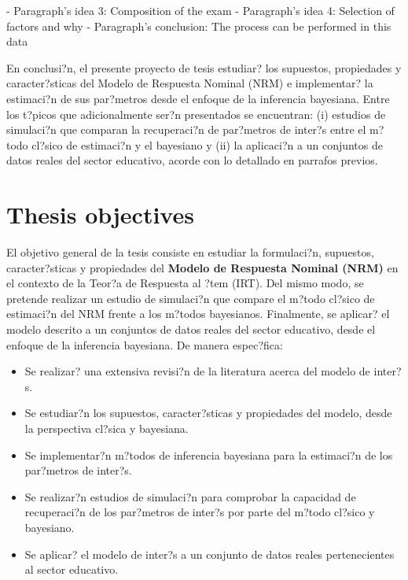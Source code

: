 - Paragraph's idea 3: Composition of the exam
- Paragraph's idea 4: Selection of factors and why
- Paragraph's conclusion: The process can be performed in this data

En conclusi?n, el presente proyecto de tesis estudiar? los supuestos, propiedades y caracter?sticas del Modelo de Respuesta Nominal (NRM) e implementar? la estimaci?n de sus par?metros desde el enfoque de la  inferencia bayesiana. Entre los t?picos que adicionalmente ser?n presentados se encuentran: (i) estudios de simulaci?n que comparan la recuperaci?n de par?metros de inter?s entre el m?todo cl?sico de estimaci?n y el bayesiano y (ii) la aplicaci?n a un conjuntos de datos reales del sector educativo, acorde con lo detallado en parrafos previos.



\section{Thesis objectives}

El objetivo general de la tesis consiste en estudiar la formulaci?n, supuestos, caracter?sticas y propiedades del \textbf{Modelo de Respuesta Nominal (NRM)}   en el contexto de la Teor?a de Respuesta al ?tem (IRT). Del mismo modo, se pretende realizar un estudio de simulaci?n que compare el m?todo cl?sico de estimaci?n del NRM frente a los m?todos bayesianos. Finalmente, se aplicar? el modelo descrito a un conjuntos de datos reales del sector educativo, desde el enfoque de la inferencia bayesiana. De manera espec?fica:

\begin{itemize}
\item Se realizar? una extensiva revisi?n de la literatura acerca del modelo de inter?s.
\item Se estudiar?n los supuestos, caracter?sticas y propiedades del modelo, desde la perspectiva cl?sica y bayesiana.
\item Se implementar?n m?todos de inferencia bayesiana para la estimaci?n de los par?metros de inter?s.
\item Se realizar?n estudios de simulaci?n para comprobar la capacidad de recuperaci?n de los par?metros de inter?s por parte del m?todo cl?sico y bayesiano.
\item Se aplicar? el modelo de inter?s a un conjunto de datos reales pertenecientes al sector educativo.
\end{itemize}